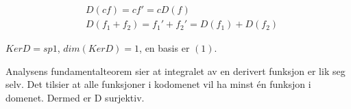 \documentclass[11pt, a4paper, norsk]{NTNUoving}
\begin{document}
\begin{oppgave}[5]
    \begin{punkt}
    \begin{align*}
        &D(cf)=cf'=cD(f)
        \\&D(f_1+f_2)=f_1'+f_2'=D(f_1)+D(f_2)
    \end{align*}
    \end{punkt}
    \begin{punkt}
        $KerD=sp{1}$, $dim(KerD)=1$, en basis er $(1)$.
    \end{punkt}
    \begin{punkt}
        Analysens fundamentalteorem sier at integralet av en derivert funksjon er lik seg selv. Det tilsier at alle funksjoner i kodomenet vil ha minst én funksjon i domenet. Dermed er D surjektiv.
    \end{punkt}
\end{oppgave}
\end{document}
